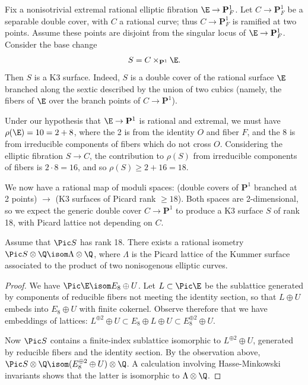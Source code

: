 \documentclass{article}
\def\P{\mathbf{P}}
\begin{document}
Fix a nonisotrivial extremal rational elliptic fibration $\E\to \P^1_F$.  
Let $C\to\P^1_F$ be a separable double cover, with $C$ a rational curve; thus $C\to\P^1_F$ is ramified at two points. Assume these points are disjoint from the singular locus of $\E\to\P^1_F$.  Consider the base change
\[ S = C\times_{\P^1} \E.\]
Then $S$ is a K3 surface.  Indeed, $S$ is a double cover of the rational surface $\E$ branched along the sextic described by the union of two cubics (namely, the fibers of $\E$ over the branch points of $C\to \P^1$).  

 Under our hypothesis that $\E\to\P^1$ is rational and extremal, we must have $\rho(\E)=10=2+8$, where the 2 is from the identity $O$ and fiber $F$, and the 8 is from irreducible components of fibers which do not cross $O$.  Considering the elliptic fibration $S\to C$, the contribution to $\rho(S)$ from irreducible components of fibers is $2\cdot 8 = 16$, and so $\rho(S)\geq 2+16=18$.  

We now have a rational map of moduli spaces: (double covers of $\P^1$ branched at 2 points) $\to$ (K3 surfaces of Picard rank $\geq 18$).  Both spaces are 2-dimensional, so we expect the generic double cover $C\to\P^1$ to produce a K3 surface $S$ of rank 18, with Picard lattice not depending on $C$.  

\begin{prop}  \label{PropRationalIsometry}  Assume that $\Pic S$ has rank 18.  
There exists a rational isometry $\Pic S\otimes \Q\isom \Lambda\otimes \Q$, where $\Lambda$ is the Picard lattice of the Kummer surface associated to the product of two nonisogenous elliptic curves. 
\end{prop}


\begin{proof}   We have $\Pic \E\isom E_8\oplus U$.   Let $L\subset \Pic \E$ be the sublattice generated by components of reducible fibers not meeting the identity section, so that $L\oplus U$ embeds into $E_8\oplus U$ with finite cokernel.   Observe therefore that we have embeddings of lattices:  $L^{\oplus 2}\oplus U \subset E_8\oplus L \oplus U \subset E_8^{\oplus 2} \oplus U$.

Now $\Pic S$ contains a finite-index sublattice isomorphic to $L^{\oplus 2}\oplus U$, generated by reducible fibers and the identity section.   By the observation above, $\Pic S\otimes \Q\isom (E_8^{\oplus 2}\oplus U)\otimes \Q$.    A calculation involving Hasse-Minkowski invariants shows that the latter is isomorphic to $\Lambda \otimes \Q$.  
\end{proof}
\end{document}
